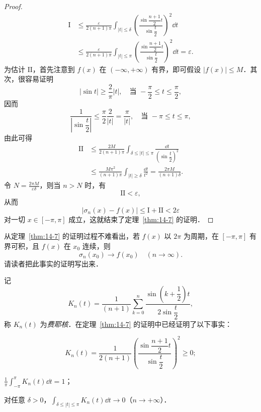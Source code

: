 \begin{proof}
\[\begin{aligned}
\mathrm{I}&\leqslant\frac{\varepsilon}{2(n+1)\pi}\int_{\left|t\right|\leqslant\delta}\left(\frac{\sin\dfrac{n+1}{2}t}{\sin\dfrac{t}{2}}\right)^{2}\dd t\\
&\leqslant\frac{\varepsilon}{2(n+1)\pi}\int_{\left|t\right|\leqslant\pi}\left(\frac{\sin\dfrac{n+1}{2}t}{\sin\dfrac{t}{2}}\right)^{2}\dd t=\varepsilon.
\end{aligned}
\]
为估计 $\mathrm{II}$，首先注意到 $f(x)$ 在 $(-\infty,+\infty)$ 有界，即可假设 $\left|f(x)\right|\leqslant M$．其次，很容易证明
\[
\left|\sin t\right|\geqslant\frac{2}{\pi}\left|t\right|,\quad\text{当 }-\frac{\pi}{2}\leqslant t\leqslant\frac{\pi}{2},
\]
因而
\[
\frac{1}{\left|\sin\dfrac{t}{2}\right|}\leqslant\frac{\pi}{2}\frac{2}{\left|t\right|}=\frac{\pi}{\left|t\right|},\quad\text{当 }-\pi\leqslant t\leqslant\pi,
\]
由此可得
\[
\begin{aligned}
\mathrm{II}&\leqslant\frac{2M}{2(n+1)\pi}\int_{\delta\leqslant\left|t\right|\leqslant\pi}\frac{\dd t}{\left(\sin\dfrac{t}{2}\right)^{2}}\\
&\leqslant\frac{M\pi^{2}}{(n+1)\pi}\int_{\left|t\right|\geqslant\delta}\frac{\dd t}{t^{2}}=\frac{2\pi M}{(n+1)\delta}.
\end{aligned}
\]
令 $\displaystyle N=\frac{2\pi M}{\varepsilon\delta}$，则当 $n>N$ 时，有
\[
\mathrm{II}<\varepsilon,
\]
从而
\[
\left|\sigma_{n}(x)-f(x)\right|\leqslant\mathrm{I}+\mathrm{II}<2\varepsilon
\]
对一切 $x\in[-\pi,\pi]$ 成立，这就结束了定理~\ref{thm:14-7} 的证明．
\end{proof}

从定理~\ref{thm:14-7} 的证明过程不难看出，若 $f(x)$ 以 $2\pi$ 为周期，在 $[-\pi,\pi]$ 有界可积，且 $f(x)$ 在 $x_{0}$ 连续，则
\[
\sigma_{n}(x_{0})\to f(x_{0})\quad(n\to\infty).
\]
请读者把此事实的证明写出来．

记
\[
K_{n}(t)=\frac{1}{(n+1)}\sum_{k=0}^{n}\frac{\sin\left(k+\dfrac{1}{2}\right)t}{2\sin\dfrac{t}{2}},
\]
称 $K_{n}(t)$ 为\emph{费耶核}．在定理~\ref{thm:14-7} 的证明中已经证明了以下事实：

\begin{ziti}
\item
\[
K_{n}(t)=\frac{1}{2(n+1)}\left(\frac{\sin\dfrac{n+1}{2}t}{\sin\dfrac{t}{2}}\right)^{2}\geqslant 0;
\]
\item $\displaystyle\frac{1}{\pi}\int_{-\pi}^{\pi}K_{n}(t)\dd t=1$；
\item 对任意 $\delta>0$，$\displaystyle\int_{\delta\leqslant\left|t\right|\leqslant\pi}K_{n}(t)\dd t\to 0$（$n\to+\infty$）．
\end{ziti}

